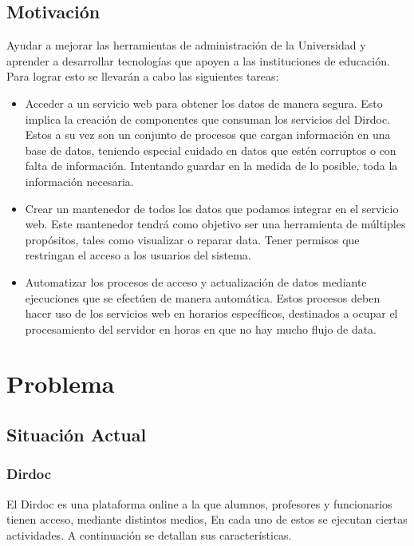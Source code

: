 \documentclass[a4paper,12pt,openany,oneside]{book}
\begin{document}
\section{Motivación}
Ayudar a mejorar las herramientas de administración de la Universidad y aprender a desarrollar tecnologías que apoyen a las instituciones de educación.
Para lograr esto se llevarán a cabo las siguientes tareas:
\begin{itemize}
	\item Acceder a un servicio web para obtener los datos de manera segura. Esto implica la creación de componentes que consuman los servicios del Dirdoc. Estos a su vez son un conjunto de procesos que cargan información en una base de datos, teniendo especial cuidado en datos que estén corruptos o con falta de información. Intentando guardar en la medida de lo posible, toda la información necesaria.
	\item Crear un mantenedor de todos los datos que podamos integrar en el servicio web. Este mantenedor tendrá como objetivo ser una herramienta de múltiples propósitos, tales como visualizar o reparar data. Tener permisos que restringan el acceso a los usuarios del sistema.
	\item Automatizar los procesos de acceso y actualización de datos mediante ejecuciones que se efectúen de manera automática. Estos procesos deben hacer uso de los servicios web en horarios específicos, destinados a ocupar el procesamiento del servidor en horas en que no hay mucho flujo de data.
\end{itemize}

\chapter{Problema}
\thispagestyle{empty}
\section{Situación Actual}
\subsection{Dirdoc}
El Dirdoc es una plataforma online a la que alumnos, profesores y funcionarios tienen acceso, mediante distintos medios, En cada uno de estos se ejecutan ciertas actividades. A continuación se detallan sus características.
\end{document}
